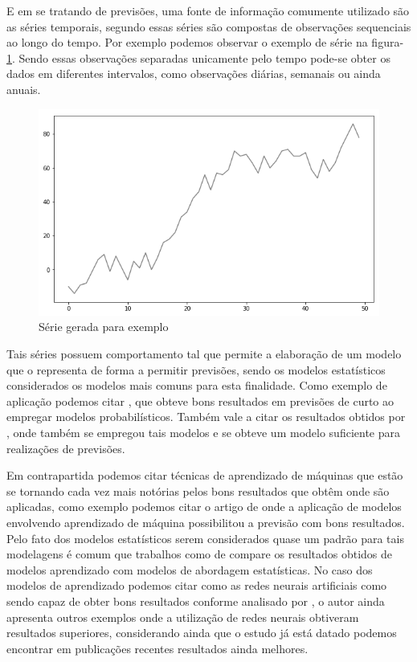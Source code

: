 \documentclass[
	12pt,
	oneside,
	a4paper,
	english,
	brazil
]{abntex2}
\begin{document}
E em se tratando de previsões, uma fonte de informação comumente utilizado são 
as séries temporais, segundo  essas séries são compostas de 
observações sequenciais ao longo do tempo. Por exemplo podemos observar o 
exemplo de série na figura-\ref{serie0}. Sendo essas observações separadas 
unicamente pelo tempo pode-se obter os dados em diferentes intervalos, como 
observações diárias, semanais ou ainda anuais.

\begin{figure}[ht]
    \centering
    \caption{Série gerada para exemplo}\label{serie0}
    \includegraphics[width=.6\linewidth]{serie_exemplo.png}
\end{figure}

Tais séries possuem comportamento tal que permite a elaboração de um modelo que 
o representa de forma a permitir previsões, sendo os modelos estatísticos 
considerados os modelos mais comuns para esta finalidade. Como exemplo de 
aplicação podemos citar , que obteve bons resultados em 
previsões de curto ao empregar modelos probabilísticos. Também vale a citar os 
resultados obtidos por , onde também se empregou tais 
modelos e se obteve um modelo suficiente para realizações de previsões.

Em contrapartida podemos citar técnicas de aprendizado de máquinas que estão se 
tornando cada vez mais notórias pelos bons resultados que obtêm onde são 
aplicadas, como exemplo podemos citar o artigo de  onde a 
aplicação de modelos envolvendo aprendizado de máquina possibilitou a previsão 
com bons resultados. Pelo fato dos modelos estatísticos serem considerados quase 
um padrão para tais modelagens é comum que trabalhos como de 
 compare os resultados obtidos de modelos aprendizado com 
modelos de abordagem estatísticas. No caso dos modelos de aprendizado podemos 
citar como as redes neurais artificiais como sendo capaz de obter bons 
resultados conforme analisado por , o autor ainda apresenta 
outros exemplos onde a utilização de redes neurais obtiveram resultados 
superiores, considerando ainda que o estudo já está datado podemos encontrar em 
publicações recentes resultados ainda melhores.
\end{document}

